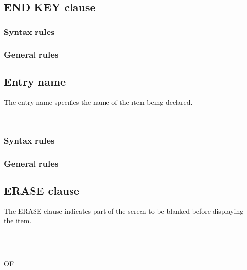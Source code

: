 \subsection{END KEY clause}

\begin{syntax}[\deletedcolour]
\end{syntax}

\subsubsection{Syntax rules}

\subsubsection{General rules}

\subsection{Entry name}

The entry name specifies the name of the item being declared.

\begin{syntax}
  \begin{0-1}
     \\
    \identifier
  \end{0-1}
\end{syntax}

\subsubsection{Syntax rules}

\subsubsection{General rules}


\subsection{ERASE clause}

The ERASE clause indicates part of the screen to be blanked before displaying the item.

\begin{syntax}
  \begin{1=}
     \\
     \\

    \begin{0-1}
        OF
    \end{0-1}
    \begin{1=}
       \\
    \end{1=}
  \end{1=}
\end{syntax}


